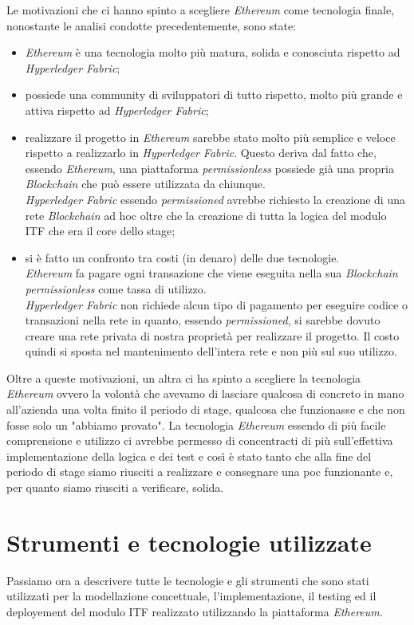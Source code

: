 Le motivazioni che ci hanno spinto a scegliere \textit{Ethereum} come tecnologia finale, nonostante le analisi condotte precedentemente, sono state:
\begin{itemize}
	\item \textit{Ethereum} è una tecnologia molto più matura, solida e conosciuta rispetto ad \textit{Hyperledger Fabric};
	\item possiede una community di sviluppatori di tutto rispetto, molto più grande e attiva rispetto ad \textit{Hyperledger Fabric};
	\item realizzare il progetto in \textit{Ethereum} sarebbe stato molto più semplice e veloce rispetto a realizzarlo in \textit{Hyperledger Fabric}. Questo deriva dal fatto che, essendo \textit{Ethereum}, una piattaforma \textit{permissionless} possiede già una propria \textit{Blockchain} che può essere utilizzata da chiunque.\\
	\textit{Hyperledger Fabric} essendo \textit{permissioned} avrebbe richiesto la creazione di una rete \textit{Blockchain} ad hoc oltre che la creazione di tutta la logica del modulo \gls{ITF} che era il core dello stage;
	\item si è fatto un confronto tra costi (in denaro) delle due tecnologie.\\
	\textit{Ethereum} fa pagare ogni transazione che viene eseguita nella sua \textit{Blockchain permissionless} come tassa di utilizzo.\\
	\textit{Hyperledger Fabric} non richiede alcun tipo di pagamento per eseguire codice o transazioni nella rete in quanto, essendo \textit{permissioned}, si sarebbe dovuto creare una rete privata di nostra proprietà per realizzare il progetto. Il costo quindi si sposta nel mantenimento dell'intera rete e non più sul suo utilizzo.
\end{itemize}
Oltre a queste motivazioni, un altra ci ha spinto a scegliere la tecnologia \textit{Ethereum} ovvero la volontà che avevamo di lasciare qualcosa di concreto in mano all'azienda una volta finito il periodo di stage, qualcosa che funzionasse e che non fosse solo un "abbiamo provato". La tecnologia \textit{Ethereum} essendo di più facile comprensione e utilizzo ci avrebbe permesso di concentracti di più sull'effettiva implementazione della logica e dei test e così è stato tanto che alla fine del periodo di stage siamo riusciti a realizzare e consegnare una \gls{poc} funzionante e, per quanto siamo riusciti a verificare, solida.

\section{Strumenti e tecnologie utilizzate}
Passiamo ora a descrivere tutte le tecnologie e gli strumenti che sono stati utilizzati per la modellazione concettuale, l'implementazione, il testing ed il deployement del modulo \gls{ITF} realizzato utilizzando la piattaforma \textit{Ethereum}.

